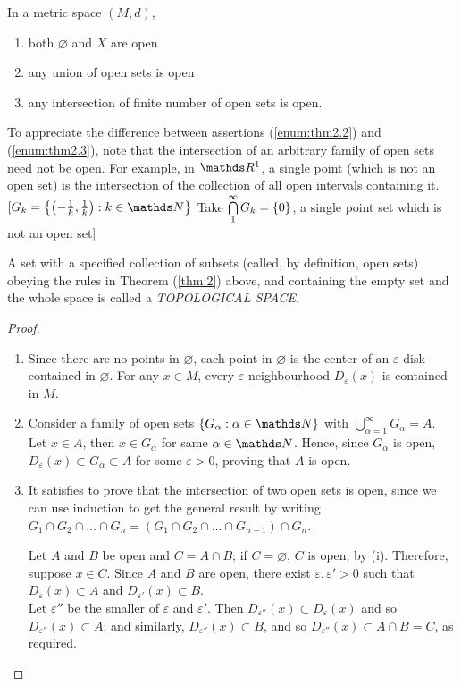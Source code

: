 \documentclass[../main-sheet.tex]{subfiles}
\begin{document}
\begin{thm}\label{thm:2}
    In a metric space $ (M,d) $,
    \begin{enumerate}[label=(\roman*)]
        \item both $ \varnothing $ and $ X $ are open
        \item any union of open sets is open \label{enum:thm2.2}
        \item any intersection of finite number of open sets is open.\label{enum:thm2.3}
    \end{enumerate}
\end{thm}

To appreciate the difference between assertions (\ref{enum:thm2.2}) and (\ref{enum:thm2.3}), note that the intersection of an arbitrary family of open sets need not be open. For example, in $ \R^1 $, a single point (which is not an open set) is the intersection of the collection of all open intervals containing it. $ [G_k=\set{\left( -\frac{1}{k},\frac{1}{k} \right): k \in \N} $ Take $ \bigcap\limits_1^{\infty}G_k=\left\{0\right\} $, a single point set which is not an open set]
\begin{note}
    A set with a specified collection of subsets (called, by definition, open sets) obeying the rules in Theorem (\ref{thm:2}) above, and containing the empty set and the whole space is called a \emph{TOPOLOGICAL SPACE}.
\end{note}
\begin{proof}
    \hfill
    \begin{enumerate}[label=(\roman*)]
        \item Since there are no points in $ \varnothing $, each point in $ \varnothing $ is the center of an $ \varepsilon $-disk contained in $ \varnothing $. For any $ x\in M $, every $ \varepsilon $-neighbourhood $ D_\varepsilon(x) $ is contained in $ M $.
        \item Consider a family of open sets $ \set{G_\alpha :\alpha\in \N} $ with $ \bigcup_{\alpha=1}^\infty G_\alpha=A $. Let $ x\in A $, then $ x\in G_\alpha $ for same $ \alpha\in \N $. Hence, since $ G_\alpha $ is open, $ D_\varepsilon(x)\subset G_\alpha\subset A $ for some $ \varepsilon>0 $, proving that $ A $ is open.
        \item It satisfies to prove that the intersection of two open sets is open, since we can use induction to get the general result by writing $ G_1\cap G_2\cap \dots\cap G_n=(G_1\cap G_2\cap \dots\cap G_{n-1})\cap G_n $.
        
        Let $ A $ and $ B $ be open and $ C =A\cap B $; if $ C=\varnothing $, $ C $ is open, by (i). Therefore, suppose $ x\in C $. Since $ A $ and $ B $ are open, there exist $ \varepsilon,\varepsilon'>0 $ such that $ D_\varepsilon(x)\subset A $ and $ D_{\varepsilon'}(x)\subset B$.\\
        Let $ \varepsilon'' $ be the smaller of $ \varepsilon $ and $ \varepsilon' $. Then $ D_{\varepsilon''}(x)\subset D_\varepsilon(x) $ and so $ D_{\varepsilon''}(x)\subset A  $; and similarly, $ D_{\varepsilon''}(x)\subset B $, and so $ D_{\varepsilon''}(x)\subset A\cap B=C $, as required.
    \end{enumerate}
\end{proof}
\end{document}
